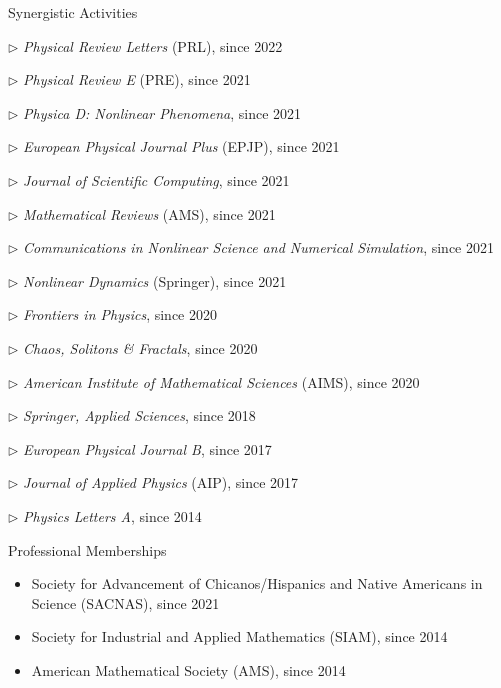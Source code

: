 \documentclass[10pt]{article} %
\newenvironment{outerlist}[1][\enskip\textbullet]%
        {\begin{itemize}[#1]}{\end{itemize}%
         \vspace{-.6\baselineskip}}
\newenvironment{innerlist}[1][\enskip\textbullet]%
        {\begin{compactitem}[#1]}{\end{compactitem}}
\begin{document}
\begin{section}{Synergistic Activities}
\begin{outerlist}
\begin{innerlist}
\item[$\triangleright$] \textit{Physical Review Letters} (PRL), since 2022
\item[$\triangleright$] \textit{Physical Review E} (PRE), since 2021
\item[$\triangleright$] \textit{Physica D: Nonlinear Phenomena}, since 2021
\item[$\triangleright$] \textit{European Physical Journal Plus} (EPJP), since 2021
\item[$\triangleright$] \textit{Journal of Scientific Computing}, since 2021
\item[$\triangleright$] \textit{Mathematical Reviews} (AMS), since 2021 
\item[$\triangleright$] \textit{Communications in Nonlinear Science and Numerical Simulation}, since 2021 
\item[$\triangleright$] \textit{Nonlinear Dynamics} (Springer), since 2021 
\item[$\triangleright$] \textit{Frontiers in Physics}, since 2020
\item[$\triangleright$] \textit{Chaos, Solitons \& Fractals}, since 2020
\item[$\triangleright$] \textit{American Institute of Mathematical Sciences} (AIMS), since 2020
\item[$\triangleright$] \textit{Springer, Applied Sciences}, since 2018
\item[$\triangleright$] \textit{European Physical Journal B}, since 2017
\item[$\triangleright$] \textit{Journal of Applied Physics} (AIP), since 2017
\item[$\triangleright$] \textit{Physics Letters A}, since 2014
\end{innerlist}

\end{outerlist}

\end{section}

\begin{section}{Professional Memberships}
\begin{outerlist}
\item \vskip -7mm
Society for Advancement of Chicanos/Hispanics and Native Americans in Science (SACNAS), since 2021
\item Society for Industrial and Applied Mathematics (SIAM), since 2014
\item American Mathematical Society (AMS), since 2014
\end{outerlist}

\end{section}
\end{document}
